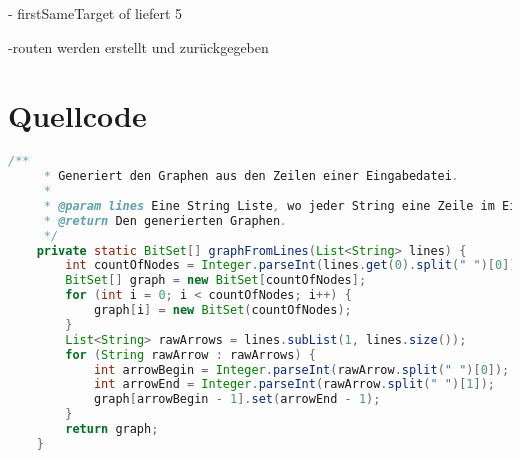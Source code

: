\documentclass[a4paper,10pt,ngerman]{scrartcl}
\begin{document}
    - firstSameTarget of liefert 5

    -routen werden erstellt und zurückgegeben


    \section{Quellcode}
    \label{sec:quellcode}
    \label{LastPage}
    \begin{lstlisting}[frame=single,language=Java,title=Methode graphFromLines,breaklines=true]
    /**
     * Generiert den Graphen aus den Zeilen einer Eingabedatei.
     *
     * @param lines Eine String Liste, wo jeder String eine Zeile im Eingabeformat ist.
     * @return Den generierten Graphen.
     */
    private static BitSet[] graphFromLines(List<String> lines) {
        int countOfNodes = Integer.parseInt(lines.get(0).split(" ")[0]);
        BitSet[] graph = new BitSet[countOfNodes];
        for (int i = 0; i < countOfNodes; i++) {
            graph[i] = new BitSet(countOfNodes);
        }
        List<String> rawArrows = lines.subList(1, lines.size());
        for (String rawArrow : rawArrows) {
            int arrowBegin = Integer.parseInt(rawArrow.split(" ")[0]);
            int arrowEnd = Integer.parseInt(rawArrow.split(" ")[1]);
            graph[arrowBegin - 1].set(arrowEnd - 1);
        }
        return graph;
    }
    \end{lstlisting}
\end{document}
